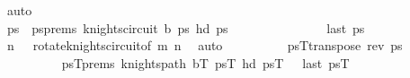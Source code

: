 \begin{isabellebody}
\ auto\isanewline
\ \ \ \ \ \ \ \ \ \ \isamarkupfalse%
\isanewline
\ \ \ \ \ \ \ \ \isamarkupfalse%
\isanewline
\ \ \ \ \ \ \ \ \isamarkupfalse%
\ \isamarkupfalse%
\ ps\ \ psprems{\isacharcolon}{\kern0pt}\ {\isachardoublequoteopen}knights{\isacharunderscore}{\kern0pt}circuit\ {\isacharquery}{\kern0pt}b\ ps\ {\isachardoublequoteopen}hd\ ps\ {\isacharequal}{\kern0pt}\ {\isacharparenleft}{\kern0pt}{}{\isacharcomma}{\kern0pt}{}{\isacharparenright}{\kern0pt}{\isachardoublequoteclose}\ \isanewline
\ \ \ \ \ \ \ \ \ \ \ \ {\isachardoublequoteopen}last\ ps\ {\isacharequal}{\kern0pt}\ {\isacharparenleft}{\kern0pt}{}{\isacharcomma}{\kern0pt}{}{\isacharparenright}{\kern0pt}{\isachardoublequoteclose}\isanewline
\ \ \ \ \ \ \ \ \ \ \isamarkupfalse%
\ {\isacartoucheopen}n{\isacharminus}{\kern0pt}{}\ {\isasymge}\ {}{\isacartoucheclose}\ rotate{\isacharunderscore}{\kern0pt}knights{\isacharunderscore}{\kern0pt}circuit{\isacharbrackleft}{\kern0pt}of\ m\ {\isachardoublequoteopen}n{\isacharminus}{\kern0pt}{}{\isachardoublequoteclose}{\isacharbrackright}{\kern0pt}\ \isamarkupfalse%
\ auto\isanewline
\ \ \ \ \ \ \ \ \isamarkupfalse%
\ {\isacharquery}{\kern0pt}psT{\isacharequal}{\kern0pt}{\isachardoublequoteopen}transpose\ {\isacharparenleft}{\kern0pt}rev\ ps\isanewline
\ \ \ \ \ \ \ \ \isamarkupfalse%
\ psT{\isacharunderscore}{\kern0pt}prems{\isacharcolon}{\kern0pt}\ {\isachardoublequoteopen}knights{\isacharunderscore}{\kern0pt}path\ {\isacharquery}{\kern0pt}bT\ {\isacharquery}{\kern0pt}psT{\isachardoublequoteclose}\ {\isachardoublequoteopen}hd\ {\isacharquery}{\kern0pt}psT\ {\isacharequal}{\kern0pt}\ {\isacharparenleft}{\kern0pt}{}{\isacharcomma}{\kern0pt}{}{\isacharparenright}{\kern0pt}{\isachardoublequoteclose}\ {\isachardoublequoteopen}last\ {\isacharquery}{\kern0pt}psT\ {\isacharequal}{\kern0pt}\ {\isacharparenleft}{\kern0pt}{}{\isacharcomma}{\kern0pt}{}{\isacharparenright}{\kern0pt}{\isachardoublequoteclose}\isanewline

\end{isabellebody}
